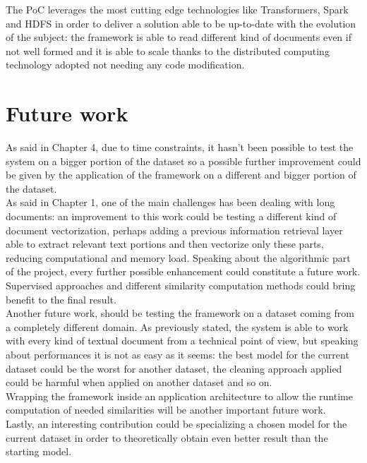 \documentclass[\main/main.tex]{subfiles}
\begin{document}
The PoC leverages the most cutting edge technologies like Transformers, Spark and HDFS in order to deliver a solution able to be up-to-date with the evolution of the subject: the framework is able to read different kind of documents even if not well formed and it is able to scale thanks to the distributed computing technology adopted not needing any code modification. 


\section{Future work}
As said in Chapter 4, due to time constraints, it hasn't been possible to test the system on a bigger portion of the dataset so a possible further improvement could be given by the application of the framework on a different and bigger portion of the dataset. \\
As said in Chapter 1, one of the main challenges has been dealing with long documents: an improvement to this work could be testing a different kind of document vectorization, perhaps adding a previous information retrieval layer able to extract relevant text portions and then vectorize only these parts, reducing computational and memory load. Speaking about the algorithmic part of the project, every further possible enhancement could constitute a future work. Supervised approaches and different similarity computation methods could bring benefit to the final result.\\
Another future work, should be testing the framework on a dataset coming from a completely different domain. As previously stated, the system is able to work with every kind of textual document from a technical point of view, but speaking about performances it is not as easy as it seems: the best model for the current dataset could be the worst for another dataset, the cleaning approach applied could be harmful when applied on another dataset and so on.\\
Wrapping the framework inside an application architecture to allow the runtime computation of needed similarities will be another important future work. \\
Lastly, an interesting contribution could be specializing a chosen model for the current dataset in order to theoretically obtain even better result than the starting model.
\newpage
\newpage
\end{document}
